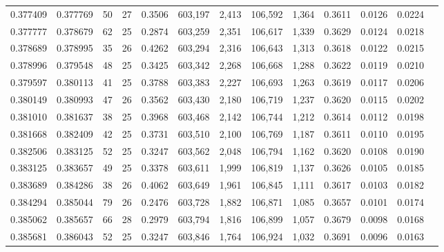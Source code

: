 \begin{tabular}{rrrrrrrrrrrrr}
0.377409 & 0.377769 &  50 &  27 &                                     0.3506 & 603,197 &   2,413 & 106,592 &   1,364 & 0.3611 & 0.0126 & 0.0224 \\
0.377777 & 0.378679 &  62 &  25 &                                     0.2874 & 603,259 &   2,351 & 106,617 &   1,339 & 0.3629 & 0.0124 & 0.0218 \\
0.378689 & 0.378995 &  35 &  26 &                                     0.4262 & 603,294 &   2,316 & 106,643 &   1,313 & 0.3618 & 0.0122 & 0.0215 \\
0.378996 & 0.379548 &  48 &  25 &                                     0.3425 & 603,342 &   2,268 & 106,668 &   1,288 & 0.3622 & 0.0119 & 0.0210 \\
0.379597 & 0.380113 &  41 &  25 &                                     0.3788 & 603,383 &   2,227 & 106,693 &   1,263 & 0.3619 & 0.0117 & 0.0206 \\
0.380149 & 0.380993 &  47 &  26 &                                     0.3562 & 603,430 &   2,180 & 106,719 &   1,237 & 0.3620 & 0.0115 & 0.0202 \\
0.381010 & 0.381637 &  38 &  25 &                                     0.3968 & 603,468 &   2,142 & 106,744 &   1,212 & 0.3614 & 0.0112 & 0.0198 \\
0.381668 & 0.382409 &  42 &  25 &                                     0.3731 & 603,510 &   2,100 & 106,769 &   1,187 & 0.3611 & 0.0110 & 0.0195 \\
0.382506 & 0.383125 &  52 &  25 &                                     0.3247 & 603,562 &   2,048 & 106,794 &   1,162 & 0.3620 & 0.0108 & 0.0190 \\
0.383125 & 0.383657 &  49 &  25 &                                     0.3378 & 603,611 &   1,999 & 106,819 &   1,137 & 0.3626 & 0.0105 & 0.0185 \\
0.383689 & 0.384286 &  38 &  26 &                                     0.4062 & 603,649 &   1,961 & 106,845 &   1,111 & 0.3617 & 0.0103 & 0.0182 \\
0.384294 & 0.385044 &  79 &  26 &                                     0.2476 & 603,728 &   1,882 & 106,871 &   1,085 & 0.3657 & 0.0101 & 0.0174 \\
0.385062 & 0.385657 &  66 &  28 &                                     0.2979 & 603,794 &   1,816 & 106,899 &   1,057 & 0.3679 & 0.0098 & 0.0168 \\
0.385681 & 0.386043 &  52 &  25 &                                     0.3247 & 603,846 &   1,764 & 106,924 &   1,032 & 0.3691 & 0.0096 & 0.0163 \\

\end{tabular}
